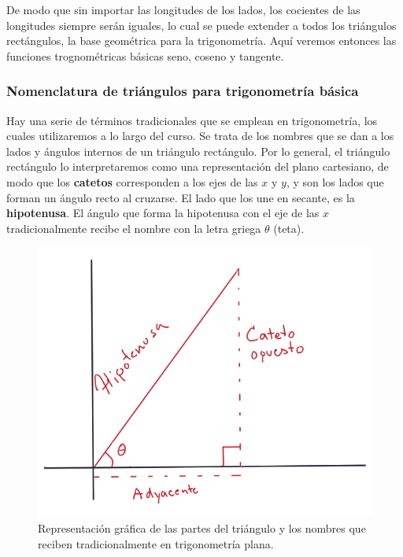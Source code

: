 \documentclass[
]{book}
\begin{document}
De modo que sin importar las longitudes de los lados, los cocientes de las longitudes siempre serán iguales, lo cual se puede extender a todos los triángulos rectángulos, la base geométrica para la trigonometría. Aquí veremos entonces las funciones trognométricas básicas seno, coseno y tangente.

\hypertarget{nomenclatura-de-triuxe1ngulos-para-trigonometruxeda-buxe1sica}{%
\subsubsection{Nomenclatura de triángulos para trigonometría básica}\label{nomenclatura-de-triuxe1ngulos-para-trigonometruxeda-buxe1sica}}

Hay una serie de términos tradicionales que se emplean en trigonometría, los cuales utilizaremos a lo largo del curso. Se trata de los nombres que se dan a los lados y ángulos internos de un triángulo rectángulo. Por lo general, el triángulo rectángulo lo interpretaremos como una representación del plano cartesiano, de modo que los \textbf{catetos} corresponden a los ejes de las \(x\) y \(y\), y son los lados que forman un ángulo recto al cruzarse. El lado que los une en secante, es la \textbf{hipotenusa}. El ángulo que forma la hipotenusa con el eje de las \(x\) tradicionalmente recibe el nombre con la letra griega \(\theta\) (teta).

\begin{figure}

{\centering \includegraphics[width=7.86in]{Unidad-II/nomenclatura} 

}

\caption{Representación gráfica de las partes del triángulo y los nombres que reciben tradicionalmente en trigonometría plana.}\label{fig:nomen-trig}
\end{figure}
\end{document}
